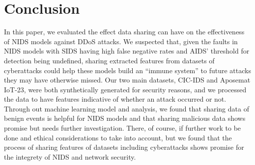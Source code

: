 \section{Conclusion}
\label{sec:conclusion}

In this paper, we evaluated the effect data sharing can have on the effectiveness of NIDS models against DDoS attacks. We suspected that, given the faults in NIDS models with SIDS having high false negative rates and AIDS’ threshold for detection being undefined, sharing extracted features from datasets of cyberattacks could help these models build an “immune system” to future attacks they may have otherwise missed. Our two main datasets, CIC-IDS and Aposemat IoT-23, were both synthetically generated for security reasons, and we processed the data to have features indicative of whether an attack occurred or not. Through out machine learning model and analysis, we found that sharing data of benign events is helpful for NIDS models and that sharing malicious data shows promise but needs further investigation. There, of course, if further work to be done and ethical considerations to take into account, but we found that the process of sharing features of datasets including cyberattacks shows promise for the integrety of NIDS and network security. 